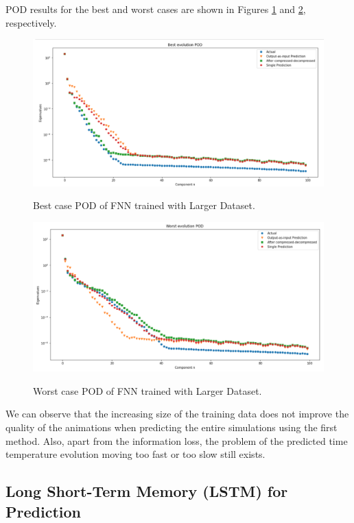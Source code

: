 POD results for the best and worst cases are shown in Figures \ref{figure:FNN_larger_best_POD} and \ref{figure:FNN_larger_worst_POD}, respectively.

\begin{figure}[H]
    \caption{Best case POD of FNN trained with Larger Dataset.}
    \includegraphics[scale=0.5]{figures/mantle_convection_images/larger_dataset/FNN_Best_POD.png}
    \label{figure:FNN_larger_best_POD}
\end{figure}

\begin{figure}[H]
    \caption{Worst case POD of FNN trained with Larger Dataset.}
    \includegraphics[scale=0.5]{figures/mantle_convection_images/larger_dataset/FNN_Worst_POD.png}
    \label{figure:FNN_larger_worst_POD}
\end{figure}

We can observe that the increasing size of the training data does not improve the quality of the animations when predicting the entire simulations using the first method. Also, apart from the information loss, the problem of the predicted time temperature evolution moving too fast or too slow still exists.


\subsection{Long Short-Term Memory (LSTM) for Prediction}

